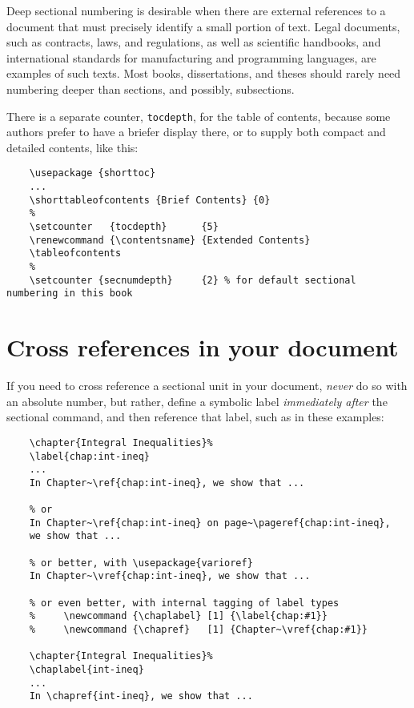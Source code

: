 Deep sectional numbering is desirable when there are external
references to a document that must precisely identify a small portion
of text.  Legal documents, such as contracts, laws, and regulations,
as well as scientific handbooks, and international standards for
manufacturing and programming languages, are examples of such texts.
Most books, dissertations, and theses should rarely need numbering
deeper than sections, and possibly, subsections.

There is a separate counter, \verb=tocdepth=, for the table of
contents, because some authors prefer to have a briefer display there,
or to supply both compact and detailed contents, like this:
%
\begin{verbatim}
    \usepackage {shorttoc}
    ...
    \shorttableofcontents {Brief Contents} {0}
    %
    \setcounter   {tocdepth}      {5}
    \renewcommand {\contentsname} {Extended Contents}
    \tableofcontents
    %
    \setcounter {secnumdepth}     {2} % for default sectional numbering in this book
\end{verbatim}

\section{Cross references in your document}

If you need to cross reference a sectional unit in your document,
\emph{never} do so with an absolute number, but rather, define a
symbolic label \emph{immediately after} the sectional command, and
then reference that label, such as in these examples:
%
\begin{verbatim}
    \chapter{Integral Inequalities}%
    \label{chap:int-ineq}
    ...
    In Chapter~\ref{chap:int-ineq}, we show that ...

    % or
    In Chapter~\ref{chap:int-ineq} on page~\pageref{chap:int-ineq}, 
    we show that ...

    % or better, with \usepackage{varioref}
    In Chapter~\vref{chap:int-ineq}, we show that ...

    % or even better, with internal tagging of label types
    %     \newcommand {\chaplabel} [1] {\label{chap:#1}}
    %     \newcommand {\chapref}   [1] {Chapter~\vref{chap:#1}}

    \chapter{Integral Inequalities}%
    \chaplabel{int-ineq}
    ...
    In \chapref{int-ineq}, we show that ...
\end{verbatim}

